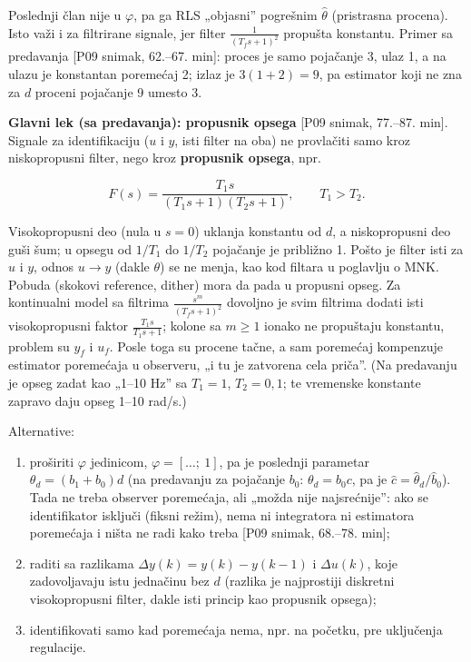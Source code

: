 \documentclass[11pt,a4paper,parskip=half,headsepline,numbers=noenddot]{scrartcl}
\DeclareRobustCommand{\izvor}[1]{{\small\color{izvorC}[#1]}}
\begin{document}
Poslednji član nije u \(\varphi\), pa ga RLS „objasni'' pogrešnim \(\hat\theta\) (pristrasna procena). Isto važi i za filtrirane signale, jer filter \(\frac{1}{(T_fs+1)^2}\) propušta konstantu. Primer sa predavanja \izvor{P09 snimak, 62.--67. min}: proces je samo pojačanje 3, ulaz 1, a na ulazu je konstantan poremećaj 2; izlaz je \(3(1 + 2) = 9\), pa estimator koji ne zna za \(d\) proceni pojačanje 9 umesto 3.

\textbf{Glavni lek (sa predavanja): propusnik opsega} \izvor{P09 snimak, 77.--87. min}. Signale za identifikaciju (\(u\) i \(y\), isti filter na oba) ne provlačiti samo kroz niskopropusni filter, nego kroz \textbf{propusnik opsega}, npr.

\[F(s) = \frac{T_1s}{(T_1s+1)(T_2s+1)},\qquad T_1 > T_2 .\]

Visokopropusni deo (nula u \(s = 0\)) uklanja konstantu od \(d\), a niskopropusni deo guši šum; u opsegu od \(1/T_1\) do \(1/T_2\) pojačanje je približno 1. Pošto je filter isti za \(u\) i \(y\), odnos \(u \to y\) (dakle \(\theta\)) se ne menja, kao kod filtara u poglavlju o MNK. Pobuda (skokovi reference, dither) mora da pada u propusni opseg. Za kontinualni model sa filtrima \(\frac{s^m}{(T_fs+1)^2}\) dovoljno je svim filtrima dodati isti visokopropusni faktor \(\frac{T_1s}{T_1s+1}\); kolone sa \(m \ge 1\) ionako ne propuštaju konstantu, problem su \(y_f\) i \(u_f\). Posle toga su procene tačne, a sam poremećaj kompenzuje estimator poremećaja u observeru, „i tu je zatvorena cela priča''. (Na predavanju je opseg zadat kao „1--10 Hz'' sa \(T_1 = 1\), \(T_2 = 0{,}1\); te vremenske konstante zapravo daju opseg 1--10 rad/s.)

Alternative:

\begin{enumerate}
\def\labelenumi{\arabic{enumi}.}
\item proširiti \(\varphi\) jedinicom, \(\varphi = [\dots;\ 1]\), pa je poslednji parametar \(\theta_d = (b_1 + b_0)d\) (na predavanju za pojačanje \(b_0\): \(\theta_d = b_0c\), pa je \(\hat c = \hat\theta_d/\hat b_0\)). Tada ne treba observer poremećaja, ali „možda nije najsrećnije'': ako se identifikator isključi (fiksni režim), nema ni integratora ni estimatora poremećaja i ništa ne radi kako treba \izvor{P09 snimak, 68.--78. min};
\item raditi sa razlikama \(\Delta y(k) = y(k) - y(k-1)\) i \(\Delta u(k)\), koje zadovoljavaju istu jednačinu bez \(d\) (razlika je najprostiji diskretni visokopropusni filter, dakle isti princip kao propusnik opsega);
\item identifikovati samo kad poremećaja nema, npr. na početku, pre uključenja regulacije.
\end{enumerate}
\end{document}
